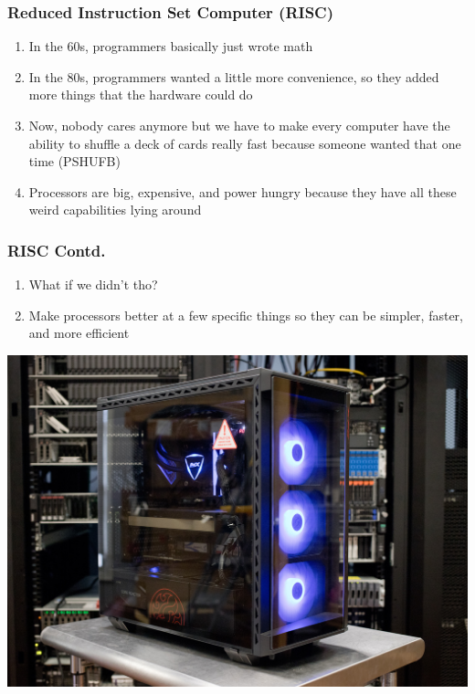 \documentclass{beamer}
\begin{document}
\begin{frame}
	\frametitle{Reduced Instruction Set Computer (RISC)}
	\begin{enumerate}
		\item{In the 60s, programmers basically just wrote math}
		\item{In the 80s, programmers wanted a little more convenience, so they added more things that the hardware could do}
		\item{Now, nobody cares anymore but we have to make every computer have the ability to shuffle a deck of cards really fast because someone wanted that one time (PSHUFB)}
		\item{Processors are big, expensive, and power hungry because they have all these weird capabilities lying around}
	\end{enumerate}
\end{frame}

\begin{frame}
	\frametitle{RISC Contd.}
	\begin{enumerate}
		\item{What if we didn't tho?}
		\item{Make processors better at a few specific things so they can be simpler, faster, and more efficient}
	\end{enumerate}
\end{frame}

\begin{frame}
	\includegraphics[scale=0.2]{bad big computer.jpg}
\end{frame}
\end{document}
